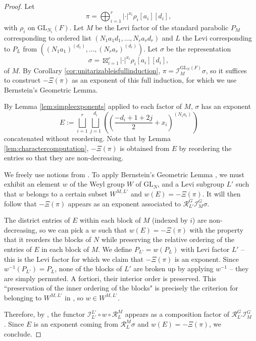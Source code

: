 \documentclass{amsart}
\newcommand{\lf}{\left}
\newcommand{\ri}{\right}
\newcommand{\f}{\frac}
\newcommand{\mc}[1]{\mathcal{#1}}
\newcommand{\GL}{\mathrm{GL}}
\newcommand{\1}{\m 1}
\theoremstyle{remark}
\theoremstyle{definition}
\numberwithin{equation}{subsection}
\newcommand{\blue}[1]{\textcolor{blue}{#1}}
\begin{document}
\begin{proof}
Let
\[
\pi = \bigoplus_{i=1}^r |\cdot|^{x_i} \rho_i[a_i][d_i],
\]
with $\rho_i$ on $\GL_{N_i}(F)$. Let $M$ be the Levi factor of the standard parabolic $P_M$ corresponding to ordered list $(N_1 a_1 d_1, \dotsc, N_r a_r d_r)$ and $L$ the Levi corresponding to $P_L$ from $((N_1 a_1)^{(d_1)}, \dotsc, (N_r a_r)^{(d_r)})$. 
Let $\sigma$ be the representation
\[
\sigma = \boxtimes_{i=1}^r |\cdot|^{x_i} \rho_i[a_i][d_i],
\]
of $M$. By Corollary  \ref{cor:unitarizableisfullinduction}, $\pi = \mc I_M^{\GL_N(F)} \sigma$, so it suffices to construct $-\Xi(\pi)$ as an exponent of this full induction, for which we use Bernstein's Geometric Lemma.  

By Lemma \ref{lem:simpleexponents} applied to each factor of $M$, $\sigma$ has an exponent 
\[
E := \bigsqcup_{i=1}^r \bigsqcup_{j=1}^{d_i} \lf(\lf(\f{-d_i + 1 + 2j}2 + x_i\ri)^{(N_ia_i)} \ri)
\]
concatenated without reordering. Note that by Lemma \ref{lem:charactercomputation}, $-\Xi(\pi)$ is obtained from $E$ by reordering the entries so that they are non-decreasing. 

We freely use notions from \cite[\S 2]{BZ77}. To apply Bernstein's Geometric Lemma \cite[Lem 2.12]{BZ77}, we must exhibit an element $w$ of the Weyl group $W$ of $\GL_N$, and a Levi subgroup $L'$ such that $w$ belongs to a certain subset $W^{M,L'}$ and $w(E) = -\Xi(\pi)$. It will then follow that $-\Xi(\pi)$ appears as an exponent associated to $\mc R^G_{L'} \mc I_M^G \sigma$. 

The district entries of $E$ within each block of $M$ (indexed by $i$) are non-decreasing, so we can pick a $w$ such that $w(E) = -\Xi(\pi)$ with the property that it reorders the blocks of $N$ while preserving the relative ordering of the entries of $E$ in each block of $M$.  We define $P_{L'} = w(P_L)$ with Levi factor $L'$ -- this is the Levi factor for which we claim that $-\Xi(\pi)$ is an exponent. Since $w^{-1}(P_{L'})=P_L$, none of the blocks of $L'$ are broken up by applying $w^{-1}$ -- they are simply permuted. A fortiori, their interior order is preserved. This ``preservation of the inner ordering of the blocks" is precisely the criterion for belonging to $W^{M,L'}$ in \cite[\S 2.11]{BZ77}, so $w\in W^{M,L'}$.

Therefore, by \cite[Lem. 2.12]{BZ77}, the functor $\mc I^{L'}_{L'} \circ w \circ \mc R^M_L$ appears as a composition factor of $\mc R^{G}_{L'}\mc I_M^G$. Since $E$ is an exponent coming from $\mc R^M_L \sigma$ and $w(E) = -\Xi(\pi)$, we conclude. 
\end{proof}
\end{document}
